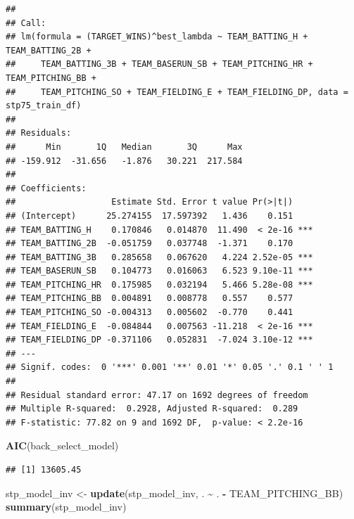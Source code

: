 \documentclass[
]{article}
\newenvironment{Shaded}{\begin{snugshade}}{\end{snugshade}}
\newcommand{\FunctionTok}[1]{\textcolor[rgb]{0.13,0.29,0.53}{\textbf{#1}}}
\newcommand{\NormalTok}[1]{#1}
\newcommand{\OtherTok}[1]{\textcolor[rgb]{0.56,0.35,0.01}{#1}}
\newcommand{\SpecialCharTok}[1]{\textcolor[rgb]{0.81,0.36,0.00}{\textbf{#1}}}
\begin{document}
\begin{verbatim}
## 
## Call:
## lm(formula = (TARGET_WINS)^best_lambda ~ TEAM_BATTING_H + TEAM_BATTING_2B + 
##     TEAM_BATTING_3B + TEAM_BASERUN_SB + TEAM_PITCHING_HR + TEAM_PITCHING_BB + 
##     TEAM_PITCHING_SO + TEAM_FIELDING_E + TEAM_FIELDING_DP, data = stp75_train_df)
## 
## Residuals:
##      Min       1Q   Median       3Q      Max 
## -159.912  -31.656   -1.876   30.221  217.584 
## 
## Coefficients:
##                   Estimate Std. Error t value Pr(>|t|)    
## (Intercept)      25.274155  17.597392   1.436    0.151    
## TEAM_BATTING_H    0.170846   0.014870  11.490  < 2e-16 ***
## TEAM_BATTING_2B  -0.051759   0.037748  -1.371    0.170    
## TEAM_BATTING_3B   0.285658   0.067620   4.224 2.52e-05 ***
## TEAM_BASERUN_SB   0.104773   0.016063   6.523 9.10e-11 ***
## TEAM_PITCHING_HR  0.175985   0.032194   5.466 5.28e-08 ***
## TEAM_PITCHING_BB  0.004891   0.008778   0.557    0.577    
## TEAM_PITCHING_SO -0.004313   0.005602  -0.770    0.441    
## TEAM_FIELDING_E  -0.084844   0.007563 -11.218  < 2e-16 ***
## TEAM_FIELDING_DP -0.371106   0.052831  -7.024 3.10e-12 ***
## ---
## Signif. codes:  0 '***' 0.001 '**' 0.01 '*' 0.05 '.' 0.1 ' ' 1
## 
## Residual standard error: 47.17 on 1692 degrees of freedom
## Multiple R-squared:  0.2928, Adjusted R-squared:  0.289 
## F-statistic: 77.82 on 9 and 1692 DF,  p-value: < 2.2e-16
\end{verbatim}

\begin{Shaded}
\begin{Highlighting}[]
\FunctionTok{AIC}\NormalTok{(back\_select\_model)}
\end{Highlighting}
\end{Shaded}

\begin{verbatim}
## [1] 13605.45
\end{verbatim}

\begin{Shaded}
\begin{Highlighting}[]
\NormalTok{stp\_model\_inv }\OtherTok{\textless{}{-}} \FunctionTok{update}\NormalTok{(stp\_model\_inv, . }\SpecialCharTok{\textasciitilde{}}\NormalTok{ . }\SpecialCharTok{{-}}\NormalTok{ TEAM\_PITCHING\_BB)}
\FunctionTok{summary}\NormalTok{(stp\_model\_inv)}
\end{Highlighting}
\end{Shaded}
\end{document}
